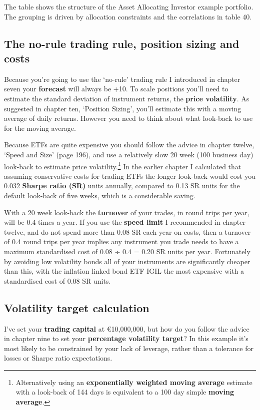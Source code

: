 The table shows the structure of the Asset Allocating Investor example portfolio. The grouping is driven by allocation constraints and the correlations in table 40.

\subsection*{The no-rule trading rule, position sizing and costs}

Because you're going to use the ‘no-rule' trading rule I introduced in chapter seven your \textbf{forecast} will always be +10. To scale positions you'll need to estimate the standard deviation of instrument returns, the \textbf{price volatility}. As suggested in chapter ten, ‘Position Sizing', you'll estimate this with a moving average of daily returns. However you need to think about what look-back to use for the moving average.

Because ETFs are quite expensive you should follow the advice in chapter twelve, ‘Speed and Size' (page 196), and use a relatively slow 20 week (100 business day) look-back to estimate price volatility.\footnote{Alternatively using an \textbf{exponentially weighted moving average} estimate with a look-back of 144 days is equivalent to a 100 day simple \textbf{moving average}.} In the earlier chapter I calculated that assuming conservative costs for trading ETFs the longer look-back would cost you 0.032 \textbf{Sharpe ratio (SR)} units annually, compared to 0.13 SR units for the default look-back of five weeks, which is a considerable saving.

With a 20 week look-back the \textbf{turnover} of your trades, in round trips per year, will be 0.4 times a year. If you use the \textbf{speed limit} I recommended in chapter twelve, and do not spend more than 0.08 SR each year on costs, then a turnover of 0.4 round trips per year implies any instrument you trade needs to have a maximum standardised cost of 0.08 ÷ 0.4 = 0.20 SR units per year. Fortunately by avoiding low volatility bonds all of your instruments are significantly cheaper than this, with the inflation linked bond ETF IGIL the most expensive with a standardised cost of 0.08 SR units.

\subsection*{Volatility target calculation}

I've set your \textbf{trading capital} at €10,000,000, but how do you follow the advice in chapter nine to set your \textbf{percentage volatility target}? In this example it's most likely to be constrained by your lack of leverage, rather than a tolerance for losses or Sharpe ratio expectations.


